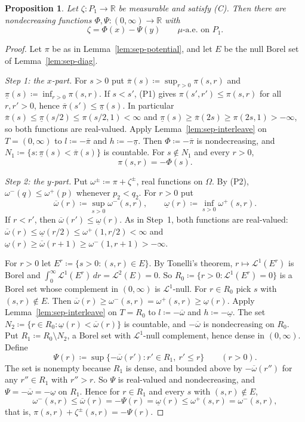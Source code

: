\documentclass[11pt]{article}
\newtheorem{proposition}[theorem]{Proposition}
\theoremstyle{definition}\newtheorem{definition}[theorem]{Definition}
\theoremstyle{remark}\newtheorem{remark}[theorem]{Remark}
\begin{document}
\begin{proposition}\label{prop:sep-abstract}
Let $\zeta\colon P_1\to\mathbb R$ be measurable and satisfy (C). Then there
are nondecreasing functions $\Phi,\Psi\colon(0,\infty)\to\mathbb R$ with
\[
 \zeta=\Phi(x)-\Psi(y)\qquad\mu\text{-a.e.\ on }P_1 .
\]
\end{proposition}

\begin{proof}
Let $\pi$ be as in Lemma~\ref{lem:sep-potential}, and let $E$ be the null
Borel set of Lemma~\ref{lem:sep-diag}.

\emph{Step 1: the $x$-part.} For $s>0$ put
$\overline\pi(s)\coloneqq\sup_{r>0}\pi(s,r)$ and
$\underline\pi(s)\coloneqq\inf_{r>0}\pi(s,r)$. If $s<s'$, (P1) gives
$\pi(s',r')\le\pi(s,r)$ for all $r,r'>0$, hence
$\overline\pi(s')\le\underline\pi(s)$. In particular
$\overline\pi(s)\le\underline\pi(s/2)\le\pi(s/2,1)<\infty$ and
$\underline\pi(s)\ge\overline\pi(2s)\ge\pi(2s,1)>-\infty$, so both functions
are real-valued. Apply Lemma~\ref{lem:sep-interleave} on $T=(0,\infty)$ to
$l\coloneqq-\overline\pi$ and $h\coloneqq-\underline\pi$. Then
$\Phi\coloneqq-\overline\pi$ is nondecreasing, and
$N_1\coloneqq\{s:\underline\pi(s)<\overline\pi(s)\}$ is countable. For
$s\notin N_1$ and every $r>0$,
\[
 \pi(s,r)=-\Phi(s).
\]

\emph{Step 2: the $y$-part.} Put $\omega^\pm\coloneqq\pi+\zeta^\pm$, real
functions on $\Omega$. By (P2), $\omega^-(q)\le\omega^+(p)$ whenever
$p_2<q_2$. For $r>0$ put
\[
 \overline\omega(r)\coloneqq\sup_{s>0}\omega^-(s,r),\qquad
 \underline\omega(r)\coloneqq\inf_{s>0}\omega^+(s,r).
\]
If $r<r'$, then $\overline\omega(r')\le\underline\omega(r)$. As in Step~1,
both functions are real-valued:
$\overline\omega(r)\le\underline\omega(r/2)\le\omega^+(1,r/2)<\infty$ and
$\underline\omega(r)\ge\overline\omega(r+1)\ge\omega^-(1,r+1)>-\infty$.

For $r>0$ let $E^r\coloneqq\{s>0:(s,r)\in E\}$. By Tonelli's theorem,
$r\mapsto\mathcal L^1(E^r)$ is Borel and
$\int_0^\infty\mathcal L^1(E^r)\,dr=\mathcal L^2(E)=0$. So
$R_0\coloneqq\{r>0:\mathcal L^1(E^r)=0\}$ is a Borel set whose complement in
$(0,\infty)$ is $\mathcal L^1$-null. For $r\in R_0$ pick $s$ with
$(s,r)\notin E$. Then
$\overline\omega(r)\ge\omega^-(s,r)=\omega^+(s,r)\ge\underline\omega(r)$.
Apply Lemma~\ref{lem:sep-interleave} on $T=R_0$ to
$l\coloneqq-\overline\omega$ and $h\coloneqq-\underline\omega$. The set
$N_2\coloneqq\{r\in R_0:\underline\omega(r)<\overline\omega(r)\}$ is
countable, and $-\overline\omega$ is nondecreasing on $R_0$. Put
$R_1\coloneqq R_0\setminus N_2$, a Borel set with $\mathcal L^1$-null
complement, hence dense in $(0,\infty)$. Define
\[
 \Psi(r)\coloneqq\sup\{-\overline\omega(r'):r'\in R_1,\ r'\le r\}\qquad(r>0).
\]
The set is nonempty because $R_1$ is dense, and bounded above by
$-\overline\omega(r'')$ for any $r''\in R_1$ with $r''>r$. So $\Psi$ is
real-valued and nondecreasing, and $\Psi=-\overline\omega=-\underline\omega$
on $R_1$. Hence for $r\in R_1$ and every $s$ with $(s,r)\notin E$,
\[
 \omega^-(s,r)\le\overline\omega(r)=-\Psi(r)=\underline\omega(r)\le\omega^+(s,r)=\omega^-(s,r),
\]
that is, $\pi(s,r)+\zeta^\pm(s,r)=-\Psi(r)$.


\end{proof}
\end{document}
